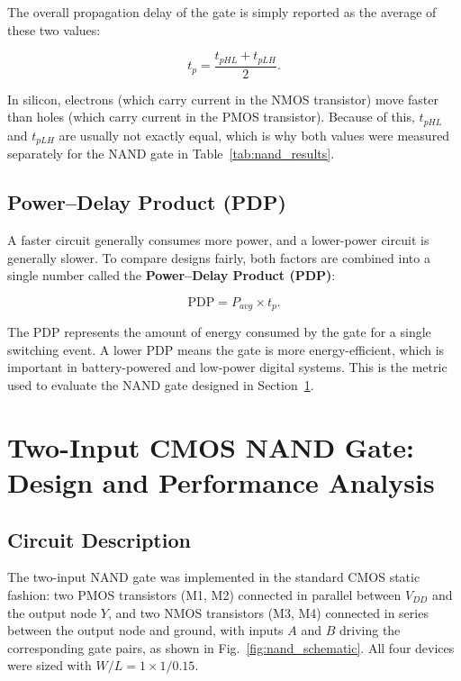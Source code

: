 \documentclass[11pt,a4paper]{article}
\begin{document}
The overall propagation delay of the gate is simply reported as the
average of these two values:

\begin{equation}
    t_{p} = \frac{t_{pHL}+t_{pLH}}{2}.
    \label{eq:tp}
\end{equation}

In silicon, electrons (which carry current in the NMOS transistor) move
faster than holes (which carry current in the PMOS transistor). Because
of this, $t_{pHL}$ and $t_{pLH}$ are usually not exactly equal, which is
why both values were measured separately for the NAND gate in
Table~\ref{tab:nand_results}.

\subsection{Power--Delay Product (PDP)}
A faster circuit generally consumes more power, and a lower-power circuit
is generally slower. To compare designs fairly, both factors are combined
into a single number called the \textbf{Power--Delay Product (PDP)}:

\begin{equation}
    \mathrm{PDP} = P_{avg}\times t_{p}.
    \label{eq:pdp}
\end{equation}

The PDP represents the amount of energy consumed by the gate for a single
switching event. A lower PDP means the gate is more energy-efficient,
which is important in battery-powered and low-power digital systems.
This is the metric used to evaluate the NAND gate designed in
Section~\ref{sec:nand}.

\section{Two-Input CMOS NAND Gate: Design and Performance Analysis}
\label{sec:nand}

\subsection{Circuit Description}
The two-input NAND gate was implemented in the standard CMOS static
fashion: two PMOS transistors (M1, M2) connected in parallel between
$V_{DD}$ and the output node $Y$, and two NMOS transistors (M3, M4)
connected in series between the output node and ground, with inputs
$A$ and $B$ driving the corresponding gate pairs, as shown in
Fig.~\ref{fig:nand_schematic}. All four devices were sized with
$W/L = 1\times1/0.15$.
\end{document}
